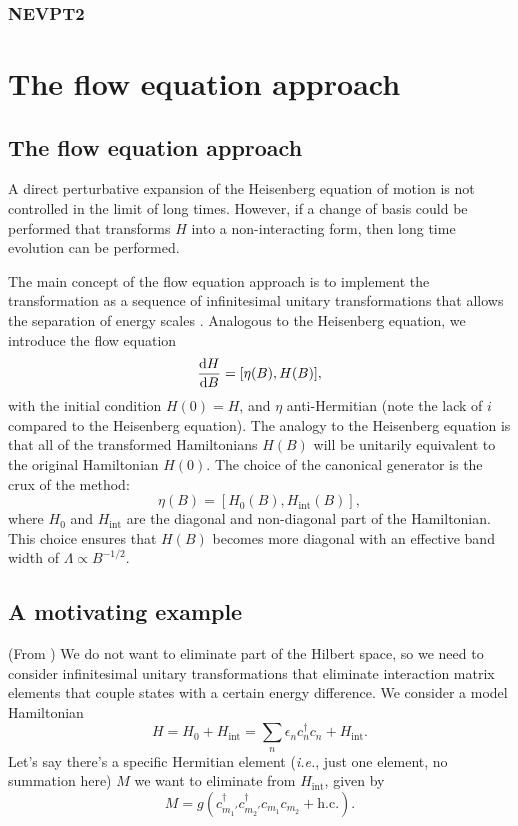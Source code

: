 \documentclass{article}
\begin{document}
\subsubsection{NEVPT2}

\section{The flow equation approach}

\subsection{The flow equation approach}
A direct perturbative expansion of the Heisenberg equation of motion is not controlled in the limit of long times. However, if a change of basis could be performed that transforms $H$ into a non-interacting form, then long time evolution can be performed.

The main concept of the flow equation approach is to implement the transformation as a sequence of infinitesimal unitary transformations that allows the separation of energy scales \cite{ecksteinNewTheoreticalApproaches2009}. Analogous to the Heisenberg equation, we introduce the flow equation
\begin{equation}
\label{eq:floweq}
\diff{H}{B}=[\eta(B), H(B)],
\end{equation}
with the initial condition $H(0)=H$, and $\eta$ anti-Hermitian (note the lack of $i$ compared to the Heisenberg equation). The analogy to the Heisenberg equation is that all of the transformed Hamiltonians $H(B)$ will be unitarily equivalent to the original Hamiltonian $H(0)$. The choice of the canonical generator is the crux of the method:
\begin{equation}
\eta(B)=[H_0(B),H_{\mathrm{int}}(B)],
\end{equation}
where $H_0$ and $H_{\mathrm{int}}$ are the diagonal and non-diagonal part of the Hamiltonian. This choice ensures that $H(B)$ becomes more diagonal with an effective band width of $\Lambda\propto B^{-1/2}$.

\subsection{A motivating example}
(From \cite[Ch. 2.2.2]{kehreinFlowEquationApproach2006}) We do not want to eliminate part of the Hilbert space, so we need to consider infinitesimal unitary transformations that eliminate interaction matrix elements that couple states with a certain energy difference. We consider a model Hamiltonian
\begin{equation}
H=H_0+H_{\mathrm{int}}=\sum_n\epsilon_nc_n^{\dagger}c_n+H_{\mathrm{int}}.
\end{equation}
Let's say there's a specific Hermitian element (\textit{i.e.}, just one element, no summation here) $M$ we want to eliminate from $H_{\mathrm{int}}$, given by
\begin{equation}
M=g(c^{\dagger}_{m_1'}c^{\dagger}_{m_2'}c_{m_1}c_{m_2}+\mathrm{h.c.}).
\end{equation}
\end{document}
